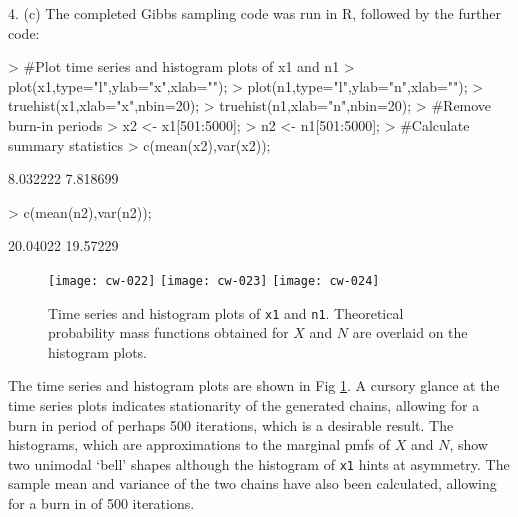 \documentclass[a4paper,11pt]{article}
\begin{document}
4. (c) The completed Gibbs sampling code was run in R, followed by the further code:

\begin{Schunk}
\begin{Sinput}
> #Plot time series and histogram plots of x1 and n1
> plot(x1,type="l",ylab="x",xlab="");
> plot(n1,type="l",ylab="n",xlab="");
> truehist(x1,xlab="x",nbin=20);
> truehist(n1,xlab="n",nbin=20);
> #Remove burn-in periods
> x2 <- x1[501:5000];
> n2 <- n1[501:5000];
> #Calculate summary statistics
> c(mean(x2),var(x2));
\end{Sinput}
\begin{Soutput}
[1] 8.032222 7.818699
\end{Soutput}
\begin{Sinput}
> c(mean(n2),var(n2));
\end{Sinput}
\begin{Soutput}
[1] 20.04022 19.57229
\end{Soutput}
\end{Schunk}

\begin{figure}[h]
\begin{centering}
\texttt{[image: cw-022]}
\texttt{[image: cw-023]}
\texttt{[image: cw-024]}
\caption{Time series and histogram plots of \texttt{x1} and
  \texttt{n1}. Theoretical probability mass functions obtained for $X$
and $N$ are overlaid on the histogram plots.}
\label{fig:Gibbs}
\end{centering}
\end{figure}
The time series and histogram plots are shown in Fig
\ref{fig:Gibbs}. A cursory glance at the time series plots indicates
stationarity of the generated chains, allowing for a burn in period of
perhaps 500 iterations, which is a desirable result. The
histograms, which are approximations to the marginal pmfs of $X$ and $N$,
show two unimodal `bell' shapes although the histogram of \texttt{x1}
hints at asymmetry. The sample mean and variance of the two
chains have also been calculated, allowing for a burn in of 500
iterations.
\end{document}
